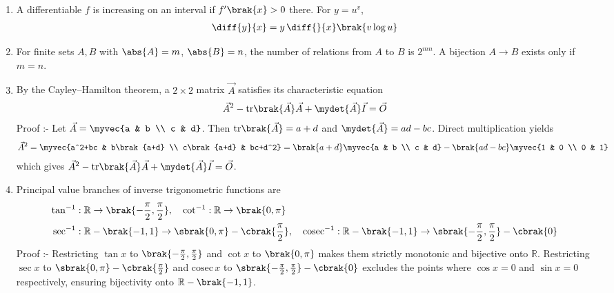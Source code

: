 \begin{enumerate}[label=\thesubsection.\arabic*, ref=\thesubsection.\theenumi]
\begin{align}
	\label{eq:EE26BTECH11226-int-root}
	\\
	\int \sec x\, dx &= \log\abs{\sec x + \tan x} + C
	\label{eq:EE26BTECH11226-int-sec}
\end{align}
\item A differentiable $f$ is increasing on an interval if $f^{\prime}\brak{x} > 0$ there. For $y=u^{v}$,
\begin{align}
	\diff{y}{x} = y\,\diff{}{x}\brak{v\log u}
	\label{eq:EE26BTECH11226-logdiff}
\end{align}
\item For finite sets $A, B$ with $\abs{A}=m$, $\abs{B}=n$,
the number of relations from $A$ to $B$ is $2^{mn}$. A bijection $A \to B$ exists only if $m = n$.
\item By the Cayley--Hamilton theorem, a $2 \times 2$ matrix $\vec{A}$ satisfies its characteristic equation
\begin{align}
	\vec{A}^2 - \text{tr}\brak{\vec{A}}\vec{A} + \mydet{\vec{A}}\vec{I} = \vec{O}
	\label{eq:EE26BTECH11226-cayley}
\end{align}
Proof :- Let $\vec{A} = \myvec{a & b \\ c & d}$. Then $\text{tr}\brak{\vec{A}} = a + d$ and $\mydet{\vec{A}} = ad - bc$. Direct multiplication yields
\begin{align}
	\vec{A}^2 = \myvec{a^2+bc & b\brak{a+d} \\ c\brak{a+d} & bc+d^2}
	= \brak{a+d}\myvec{a & b \\ c & d} - \brak{ad-bc}\myvec{1 & 0 \\ 0 & 1}
\end{align}
which gives $\vec{A}^2 - \text{tr}\brak{\vec{A}}\vec{A} + \mydet{\vec{A}}\vec{I} = \vec{O}$.
\item Principal value branches of inverse trigonometric functions are
\begin{align}
	\tan^{-1} &: \mathbb{R} \to \brak{-\frac{\pi}{2}, \frac{\pi}{2}}, \quad
	\cot^{-1} : \mathbb{R} \to \brak{0, \pi}
	\label{eq:EE26BTECH11226-invtrig1}
	\\
	\sec^{-1} &: \mathbb{R}-\brak{-1,1} \to \sbrak{0,\pi} - \cbrak{\frac{\pi}{2}}, \quad
	\text{cosec}^{-1} : \mathbb{R}-\brak{-1,1} \to \sbrak{-\frac{\pi}{2}, \frac{\pi}{2}} - \cbrak{0}
	\label{eq:EE26BTECH11226-invtrig2}
\end{align}
Proof :- Restricting $\tan x$ to $\brak{-\frac{\pi}{2}, \frac{\pi}{2}}$ and $\cot x$ to $\brak{0, \pi}$ makes them strictly monotonic and bijective onto $\mathbb{R}$. Restricting $\sec x$ to $\sbrak{0,\pi}-\cbrak{\frac{\pi}{2}}$ and $\text{cosec}\,x$ to $\sbrak{-\frac{\pi}{2}, \frac{\pi}{2}}-\cbrak{0}$ excludes the points where $\cos x = 0$ and $\sin x = 0$ respectively, ensuring bijectivity onto $\mathbb{R}-\brak{-1,1}$.

\end{enumerate}

